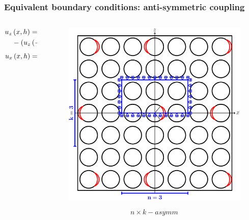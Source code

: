 \documentclass[first,firstsupp,lastsupp,last,hyperref,table]{ETHclass}
\begin{document}
\begin{frame}
\frametitle{\vspace{0.2cm}\small Equivalent boundary conditions: anti-symmetric coupling}
\vspace{-1.25cm}
\centering
\begin{columns}[c]
\begin{column}{0.5\textwidth}
\centering
\begin{equation*}
\begin{split}
\scriptsize
u_{z}&\left(x,h\right)=-u_{z}\left(0,h\right)=\\&-\left(u_{z}\left(-x,h\right)-u_{z}\left(0,h\right)\right)
\end{split}
\end{equation*}
\begin{equation*}
\scriptsize
u_{x}\left(x,h\right)=-u_{x}\left(-x,h\right)
\end{equation*}
\end{column}
\begin{column}{0.5\textwidth}
\centering
\begin{figure}
\centering
\includegraphics[width=\columnwidth]{asymm.pdf}
\end{figure}
\vspace{-0.25cm}
\begin{equation*}
n\times k-asymm
\end{equation*}
\end{column}
\end{columns}
\end{frame}
\end{document}
